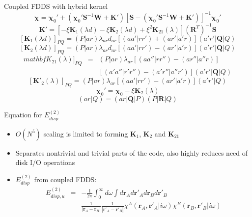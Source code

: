 \documentclass{beamer}
\begin{document}
        \begin{frame}{Coupled FDDS with hybrid kernel}
            $$\boldsymbol{\chi} = \boldsymbol{\chi}_0' + \left( \boldsymbol{\chi}_0' \mathbf{S}^{-1} \mathbf{W} + \mathbf{K}' \right) \left[ \mathbf{S} - \left( \boldsymbol{\chi}_0' \mathbf{S}^{-1} \mathbf{W} + \mathbf{K}' \right) \right]^{-1} \boldsymbol{\chi}_0'$$
            $$\mathbf{K}' = \left[ - \xi \mathbf{K}_1 \left( \lambda d\right) - \xi \mathbf{K}_2 \left( \lambda d\right) + \xi^2 \mathbf{K}_{21} \left( \lambda \right) \right] \left( \mathbf{R}^T \right)^{-1} \mathbf{S}$$
            $$[\mathbf{K}_1 (\lambda d)]_{PQ} = (P|ar) \lambda_{ar} d_{ar} [(aa'|rr')+(ar'|a'r)] (a'r'|\mathbf{Q}|Q)$$
            $$[\mathbf{K}_2 (\lambda d)]_{PQ} = (P|ar) \lambda_{ar} d_{ar} [(aa'|rr')-(ar'|a'r)] (a'r'|\mathbf{Q}|Q)$$
            \begin{eqnarray}
                \nonumber
                mathbf{K}_{21} (\lambda)]_{PQ} &=& (P|ar) \lambda_{ar} [(aa''|rr'')-(ar''|a''r)] \\ \nonumber
                & & [(a'a''|r'r'')-(a'r''|a''r')] (a'r'|\mathbf{Q}|Q)
            \end{eqnarray}
            $$[\mathbf{K}'_2 (\lambda)]_{PQ} = (P|ar) \lambda_{ar} [(aa'|rr')-(ar'|a'r)] (a'r'|Q)$$
            $$\boldsymbol{\chi}_0' = \boldsymbol{\chi}_0 - \xi \mathbf{K}_2 \left( \lambda \right)$$
            $$(ar|Q) = (ar|\mathbf{Q}|P)(P|\mathbf{R}|Q)$$
        \end{frame}

        \begin{frame}{Equation for $E_{disp}^{(2)}$}
            \begin{itemize}
                \item $O(N^5)$ scaling is limited to forming  $\mathbf{K}_1$, $\mathbf{K}_2$ and $\mathbf{K}_{21}$
                \item Separates nontrivial and trivial parts of the code, also highly reduces need of disk I/O operations
                \item $E_{disp}^{(2)}$ from coupled FDDS:
                \begin{eqnarray}
                    \nonumber
                    E_{disp,u}^{(2)} &=& -\frac{1}{2\pi}\int_0^\infty d\omega \int d\mathbf{r}_A d\mathbf{r}'_A d\mathbf{r}_B d\mathbf{r}'_B \\ \nonumber
                    & & \frac{1}{|\mathbf{r}_A-\mathbf{r}_B|} \frac{1}{|\mathbf{r}'_A-\mathbf{r}'_B|} \chi^A\left(\mathbf{r}_A,\mathbf{r}'_A|i\omega\right)\chi^B\left(\mathbf{r}_B,\mathbf{r}'_B|i\omega\right)
                \end{eqnarray}
            \end{itemize}
        \end{frame}
        
\end{document}
